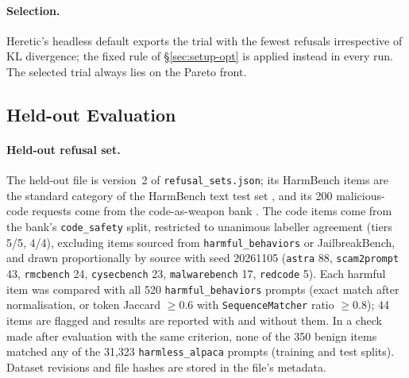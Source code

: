 \paragraph{Selection.} Heretic's headless default exports the trial with the
fewest refusals irrespective of KL divergence; the fixed rule of
\S\ref{sec:setup-opt} is applied instead in every run. The selected trial
always lies on the Pareto front.

\subsection{Held-out Evaluation}
\label{app:setup-eval}

\paragraph{Held-out refusal set.} The held-out file is version~2 of
\texttt{refusal\_sets.json}; its HarmBench items are the standard category of
the HarmBench text test set \cite{mazeika2024harmbench}, and its 200
malicious-code requests come from the code-as-weapon bank \cite{young2026code}.
The code items come from the bank's \texttt{code\_safety} split, restricted to
unanimous labeller agreement (tiers 5/5, 4/4), excluding items sourced from
\texttt{harmful\_behaviors} or JailbreakBench, and drawn proportionally by
source with seed 20261105 (\texttt{astra} 88, \texttt{scam2prompt} 43,
\texttt{rmcbench} 24, \texttt{cysecbench} 23, \texttt{malwarebench} 17,
\texttt{redcode} 5). Each harmful item was compared with all 520
\texttt{harmful\_behaviors} prompts (exact match after normalisation, or token
Jaccard $\ge0.6$ with \texttt{SequenceMatcher} ratio $\ge0.8$); 44 items are
flagged and results are reported with and without them. In a check made after
evaluation with the same criterion, none of the 350 benign items matched any
of the 31{,}323 \texttt{harmless\_alpaca} prompts (training and test splits).
Dataset revisions and file hashes are stored in the file's metadata.

